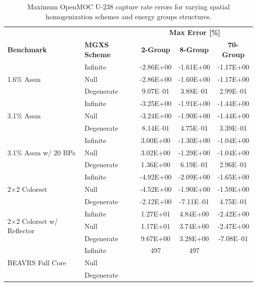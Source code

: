\begin{table}[h!]
  \centering
  \caption[Maximum OpenMOC U-238 capture rate errors]{Maximum OpenMOC U-238 capture rate errors for varying spatial homogenization schemes and energy groups structures.}
  \small
  \label{table:chap8-openmoc-max-capt-rates}
  \vspace{6pt}
  \begin{tabular}{l l c c c}
  \toprule
  \rowcolor{lightgray}
  & & \multicolumn{3}{c}{\cellcolor{lightgray} \textbf{Max Error [\%]}} \\
  \multirow{-2}{*}{\cellcolor{lightgray} \bf Benchmark} &
  \multirow{-2}{*}{\cellcolor{lightgray} \bf \ac{MGXS} Scheme} &
  {\cellcolor{lightgray} \bf 2-Group} &
  {\cellcolor{lightgray} \bf 8-Group} &
  {\cellcolor{lightgray} \bf 70-Group} \\
  \midrule
\multirow{3}{*}{\parbox{2.5cm}{1.6\% Assm}} & Infinite & -2.86E+00 & -1.61E+00 & -1.17E+00 \\
& Null & -2.86E+00 & -1.60E+00 & -1.17E+00 \\
& Degenerate & 9.07E--01 & 3.88E--01 & 2.99E--01 \\
  \midrule
\multirow{3}{*}{\parbox{2.5cm}{3.1\% Assm}} & Infinite & -3.25E+00 & -1.91E+00 & -1.44E+00 \\
& Null & -3.24E+00 & -1.90E+00 & -1.44E+00 \\
& Degenerate & 8.14E--01 & 4.75E--01 & 3.39E--01 \\
  \midrule
\multirow{3}{*}{\parbox{2.5cm}{3.1\% Assm w/ 20 BPs}} & Infinite & 3.00E+00 & -1.30E+00 & -1.04E+00 \\
& Null & 3.02E+00 & -1.29E+00 & -1.04E+00 \\
& Degenerate & 1.36E+00 & 6.19E--01 & 2.96E--01 \\
  \midrule
\multirow{3}{*}{\parbox{2.5cm}{2$\times$2 Colorset}} & Infinite & -4.92E+00 & -2.09E+00 & -1.65E+00 \\
& Null & -4.52E+00 & -1.90E+00 & -1.59E+00 \\
& Degenerate & -2.12E+00 & -7.11E--01 & 4.75E--01 \\
  \midrule
\multirow{3}{*}{\parbox{2.5cm}{2$\times$2 Colorset w/ Reflector}} & Infinite & 1.27E+01 & 4.84E+00 & -2.42E+00 \\
& Null & 1.17E+01 & 3.74E+00 & -2.47E+00 \\
& Degenerate & 9.67E+00 & 3.28E+00 & -7.08E--01 \\
  \midrule
  \multirow{3}{*}{\parbox{2cm}{\ac{BEAVRS} Full Core}} & Infinite & 497 & 497 & \\
  & Null & & & \\
  & Degenerate & & & \\
  \bottomrule
\end{tabular}
\end{table}

